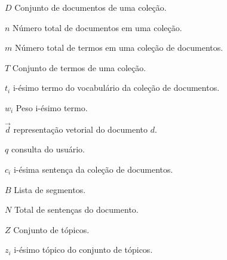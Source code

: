 


\begin{simbolos}

	\item[$D $]			Conjunto de documentos de uma coleção. 
	\item[$n $]			Número total de documentos em uma coleção.
	\item[$m $]			Número total de termos em uma coleção de documentos.
	\item[$T $]			Conjunto de termos de uma coleção. 
	\item[$t_i $]		i-ésimo termo do vocabulário da coleção de documentos. 
	\item[$w_i $]		Peso i-ésimo termo.
	\item[$ \vec{d} $]	representação vetorial do documento $d$.
	\item[$ q $]		consulta do usuário.
	\item[$ c_i $]		i-ésima sentença da coleção de documentos. 
	\item[$ B $]		Lista de segmentos. 
	\item[$ N $]		Total de sentenças do documento.
	\item[$ Z $]		Conjunto de tópicos. 
	\item[$ z_i $]		i-ésimo tópico do conjunto de tópicos. 

	 
	 
	 


 
 
 
 
 
 
 
 
 
 
 
 
 
 
 
 
 
 
 
 
  \end{simbolos}






